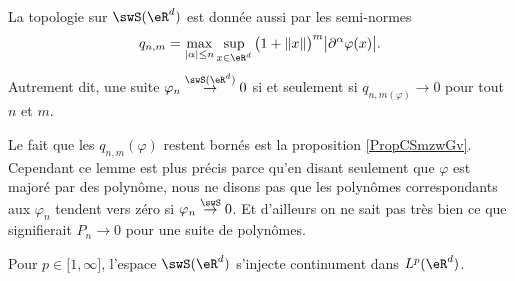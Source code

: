 \begin{lemma}   \label{LemRJhCbkO}
    La topologie sur \( \swS(\eR^d)\) est donnée aussi par les semi-normes
    \begin{equation}
        q_{n,m}=\max_{| \alpha |\leq n}\sup_{x\in \eR^d}\big( 1+\| x \| \big)^m\big| \partial^{\alpha}\varphi(x) \big|.
    \end{equation}
    Autrement dit, une suite \( \varphi_n\stackrel{\swS(\eR^d)}{\to}0\) si et seulement si \( q_{n,m(\varphi)}\to 0\) pour tout \( n\) et \( m\).
\end{lemma}
Le fait que les \( q_{n,m}(\varphi)\) restent bornés est la proposition \ref{PropCSmzwGv}. Cependant ce lemme est plus précis parce qu'en disant seulement que \( \varphi\) est majoré par des polynôme, nous ne disons pas que les polynômes correspondants aux \( \varphi_n\) tendent vers zéro si \( \varphi_n\stackrel{\swS}{\to}0\). Et d'ailleurs on ne sait pas très bien ce que signifierait \( P_n\to 0\) pour une suite de polynômes.

\begin{proposition}     \label{PropGNXBeME}
    Pour \( p\in\mathopen[ 1 , \infty \mathclose]\), l'espace \( \swS(\eR^d)\) s'injecte continument dans \( L^p(\eR^d)\). 
\end{proposition}

